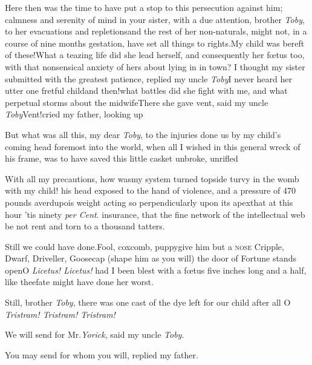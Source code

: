 \documentclass[twoside]{article}
\begin{document}
Here then was the time to have put a stop to this
persecution against him;\tsh 
{}
calmness and serenity of mind in your
sister, with a due attention, brother \textit{Toby}, to her
evacuations and repletions\tsk and the rest of her
non-naturals, might not,\break 
in a course of nine months gestation,\break
have set all things to rights.\tsk My child was
bereft of these!\tsk What a teazing life did she lead
herself, and consequently her fœtus too, with that
nonsensical\break
anxiety of hers about lying in in town?\break
I thought my sister submitted with the greatest patience,
replied my uncle \textit{Toby}\break\tsk I never heard her
utter one fretful
child\tsk and then!\@ what battles did she
fight with me, and what perpetual storms
about the midwife\tsk There she gave vent, said my uncle
\textit{Toby}\tsk Vent!\@ cried my father, looking up\tsk

But what was all this, my dear \textit{Toby},\break
to the injuries done us by my child’s\break
coming head foremost into the world,\break
when all I wished in this general wreck\break
of his frame, was to have saved this\break
little casket unbroke, unrifled\tsk

With all my precautions, how was\break my system turned
topside turvy in the womb with my child! his head exposed to
the hand of violence, and a pressure of 470 pounds
averdupois weight acting so perpendicularly upon its
apex\tsk that at this hour ’tis ninety \textit{per Cent}.
insurance, that the fine network of the intellectual web be
not rent and torn to a thousand\break
tatters.

\tsk Still we could have done.\tsh Fool,\break 
coxcomb, puppy\tsk give him but a \textsc{nose}\break
\tsh Cripple, Dwarf, Driveller, Goosecap\break
\tsh (shape him as you will) the door of Fortune stands
open\tsk O \textit{Licetus! Licetus!} had I been blest with
a fœtus five inches long and a half, like thee\tsk fate
might have done her worst.

Still, brother \textit{Toby}, there was one cast of the dye
left for our child after all\tsk\break
O \textit{Tristram! Tristram!  Tristram!}

We will send for Mr.\@ \textit{Yorick}, said my uncle \textit{Toby}.

\tsh You may send for whom you will, replied my father.
\end{document}
